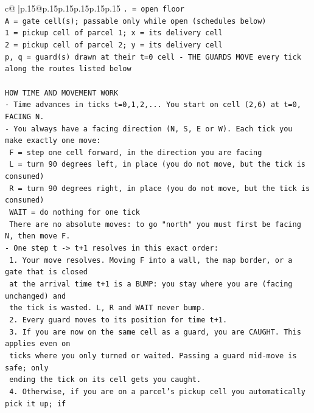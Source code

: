 \documentclass{article}
\begin{document}
{\begin{supertabular}{c@{$\;$}|p{.15\linewidth}@{}p{.15\linewidth}p{.15\linewidth}p{.15\linewidth}p{.15\linewidth}p{.15\linewidth}}
{{{\texttt{. = open floor} \\
\texttt{A = gate cell(s); passable only while open (schedules below)} \\
\texttt{1 = pickup cell of parcel 1; x = its delivery cell} \\
\texttt{2 = pickup cell of parcel 2; y = its delivery cell} \\
\texttt{p, q = guard(s) drawn at their t=0 cell {-} THE GUARDS MOVE every tick along the routes listed below} \\
\\ 
\texttt{HOW TIME AND MOVEMENT WORK} \\
\texttt{{-} Time advances in ticks t=0,1,2,... You start on cell (2,6) at t=0, FACING N.} \\
\texttt{{-} You always have a facing direction (N, S, E or W). Each tick you make exactly one move:} \\
\texttt{  F    = step one cell forward, in the direction you are facing} \\
\texttt{  L    = turn 90 degrees left, in place (you do not move, but the tick is consumed)} \\
\texttt{  R    = turn 90 degrees right, in place (you do not move, but the tick is consumed)} \\
\texttt{  WAIT = do nothing for one tick} \\
\texttt{  There are no absolute moves: to go "north" you must first be facing N, then move F.} \\
\texttt{{-} One step t {-}> t+1 resolves in this exact order:} \\
\texttt{  1. Your move resolves. Moving F into a wall, the map border, or a gate that is closed} \\
\texttt{     at the arrival time t+1 is a BUMP: you stay where you are (facing unchanged) and} \\
\texttt{     the tick is wasted. L, R and WAIT never bump.} \\
\texttt{  2. Every guard moves to its position for time t+1.} \\
\texttt{  3. If you are now on the same cell as a guard, you are CAUGHT. This applies even on} \\
\texttt{     ticks where you only turned or waited. Passing a guard mid{-}move is safe; only} \\
\texttt{     ending the tick on its cell gets you caught.} \\
\texttt{  4. Otherwise, if you are on a parcel's pickup cell you automatically pick it up; if} \\
}}}
\end{supertabular}}
\end{document}
